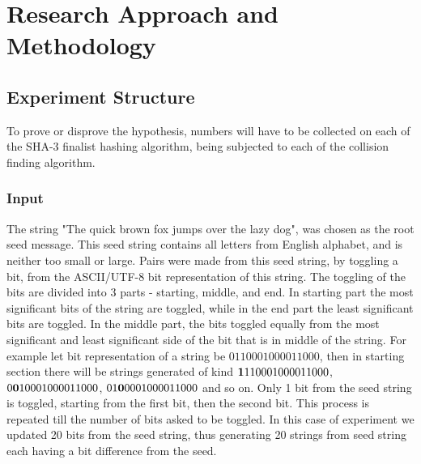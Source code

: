 \chapter{Research Approach and Methodology}







\section{Experiment Structure}

To prove or disprove the hypothesis, numbers will have to be collected on each of the SHA-3 finalist hashing
algorithm, being subjected to each of the collision finding algorithm.  

\subsection{Input}

The string "The quick brown fox jumps over the lazy dog", was chosen as the root seed message. This seed string
contains all letters from English alphabet, and is neither too small or large. Pairs were made from this seed
string, by toggling a bit, from the ASCII/UTF-8 bit representation of this string. The toggling of the bits are
divided into 3 parts - starting, middle, and end. In starting part the most significant bits of the string are
toggled, while in the end part the least significant bits are toggled. In the middle part, the bits toggled 
equally from the most significant and least significant side of the bit that is in middle of the string. For
example let bit representation of a string be $01100010 00011000$, then in starting section there will be strings
generated of kind ${\bf 1}1100010 00011000$, $0{\bf 0}100010 00011000$, $01{\bf 0}00010 00011000$ and so on. 
Only 1 bit from the seed string is toggled, starting from the first bit, then the second bit. This process is
repeated till the number of bits asked to be toggled. In this case of experiment we updated 20 bits from the
seed string, thus generating 20 strings from seed string each having a bit difference from the seed.

